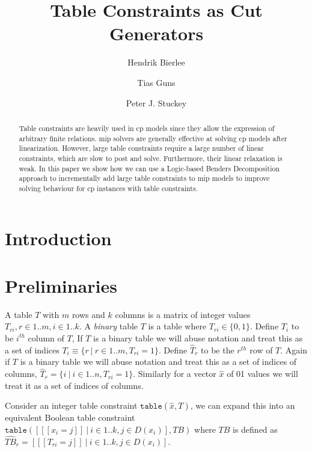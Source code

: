 \documentclass{article}
\title{\red{RESEARCH NOTE, see main.tex for paper} Table Constraints as Cut Generators}
\author{Hendrik Bierlee \and Tias Guns \and Peter J. Stuckey}
\newcommand{\brackets}[1]{\ensuremath{[\![#1]\!]}}
\begin{document}
\maketitle

\begin{abstract}
Table constraints are heavily used in \gls{cp} models since they allow the expression of arbitrary finite relations.
\gls{mip} solvers are generally effective at solving \gls{cp} models after linearization.
However, large table constraints require a large number of linear constraints, which are slow to post and solve.
Furthermore, their linear relaxation is weak.
In this paper we show how we can use a Logic-based Benders Decomposition approach to incrementally add large table constraints to \gls{mip} models to improve solving behaviour for \gls{cp} instances with table constraints.
\end{abstract}

\section{Introduction}


\section{Preliminaries}

A table $T$ with $m$ rows and $k$ columns 
is a matrix of integer values $T_{ri}, r \in 1..m, i \in 1..k$.
A \emph{binary} table $T$ is a table where $T_{ri} \in \{0,1\}$.
Define ${T}_i$ to be $i^{th}$ column of $T$,
If $T$ is a binary table we will abuse notation and
treat this as a set of indices $T_i \equiv \{ r ~|~ r \in 1..m, T_{ri} = 1\}$.
Define $\hat{T}_r$ to be the $r^{th}$ row of $T$.
Again if $T$ is a binary table we will abuse notation
and treat this as a set of indices of columns,
$\hat{T}_r = \{ i ~|~ i \in 1..n, T_{ri} = 1\}$.
Similarly for a vector $\hat{x}$ of 01 values we will treat it as a set of indices of columns.


Consider an integer table constraint $\texttt{table}(\hat{x},T)$, we can expand this into an equivalent Boolean table constraint $\texttt{table}( [ \brackets{x_i = j} ~|~ i \in 1..k, j \in D(x_i)], TB)$ 
where $TB$ is defined as 
$\hat{TB}_r = [ \brackets{T_{ri} = j} ~|~ i \in 1..k, j \in D(x_i)]$. 
\end{document}
